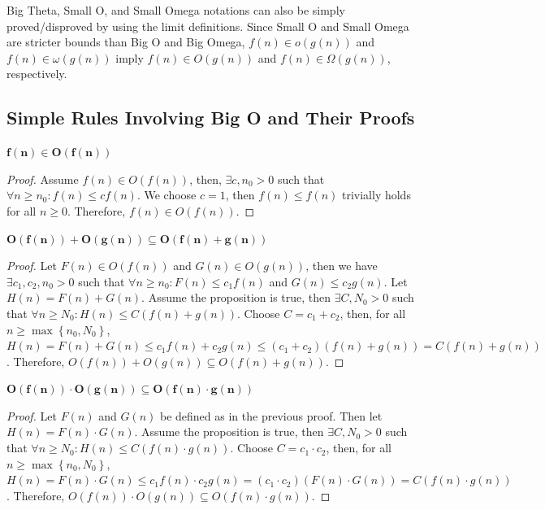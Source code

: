 \begin{remark}
    Big Theta, Small O, and Small Omega notations can also be simply proved/disproved by using the limit definitions.
    Since Small O and Small Omega are stricter bounds than Big O and Big Omega, $f(n)\in o(g(n))$ and $f(n)\in\omega(g(n))$ imply $f(n)\in O(g(n))$ and $f(n)\in\Omega(g(n))$, respectively.
\end{remark}

\subsection{Simple Rules Involving Big O and Their Proofs} \phantom{.}

\begin{proposition}
    $\bm{f(n)\in O(f(n))}$
\end{proposition}
\begin{proof}
    Assume $f(n)\in O(f(n))$, then, $\exists c, n_0 >0$ such that $\forall n\geq n_0 : f(n)\leq cf(n)$.
    We choose $c=1$, then $f(n)\leq f(n)$ trivially holds for all $n\geq 0$.
    Therefore, $f(n)\in O(f(n))$.
\end{proof}

\begin{proposition}
    $\bm{O(f(n))+O(g(n))\subseteq O(f(n)+g(n))}$
\end{proposition}
\begin{proof}
    Let $F(n)\in O(f(n))$ and $G(n)\in O(g(n))$, then we have $\exists c_1, c_2, n_0 > 0$ such that $\forall n\geq n_0 : F(n)\leq c_1f(n)$ and $G(n)\leq c_2g(n)$.
    Let $H(n) = F(n) + G(n)$.
    Assume the proposition is true, then $\exists C, N_0 > 0$ such that $\forall n\geq N_0 : H(n) \leq C(f(n)+g(n))$.
    Choose $C=c_1+c_2$, then, for all $n\geq \max\left\{n_0, N_0\right\}$, $H(n) = F(n) + G(n) \leq c_1f(n) + c_2g(n) \leq (c_1+c_2)(f(n)+g(n)) = C(f(n)+g(n))$.
    Therefore, $O(f(n))+O(g(n))\subseteq O(f(n)+g(n))$.
\end{proof}

\begin{proposition}
    $\bm{O(f(n))\cdot O(g(n))\subseteq O(f(n)\cdot g(n))}$
\end{proposition}
\begin{proof}
    Let $F(n)$ and $G(n)$ be defined as in the previous proof.
    Then let $H(n) = F(n)\cdot G(n)$.
    Assume the proposition is true, then $\exists C, N_0 > 0$ such that $\forall n\geq N_0 : H(n) \leq C(f(n)\cdot g(n))$.
    Choose $C=c_1\cdot c_2$, then, for all $n\geq \max\left\{n_0, N_0\right\}$, $H(n) = F(n)\cdot G(n) \leq c_1f(n)\cdot c_2g(n) = (c_1\cdot c_2)(F(n)\cdot G(n)) = C(f(n)\cdot g(n))$.
    Therefore, $O(f(n))\cdot O(g(n))\subseteq O(f(n)\cdot g(n))$.
\end{proof}

